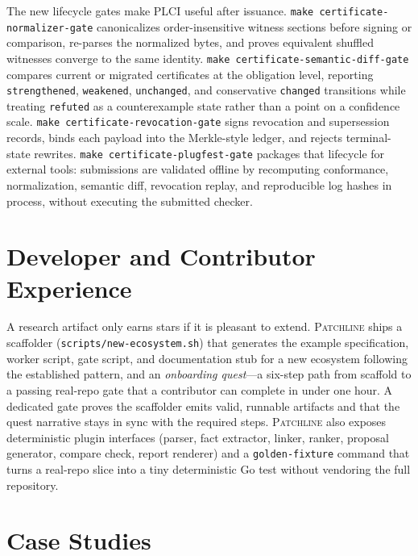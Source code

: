 \documentclass[11pt]{article}
\newcommand{\tool}{\textsc{Patchline}}
\newcommand{\code}[1]{\texttt{#1}}
\newcommand{\gate}[1]{\texttt{make #1}}
\begin{document}
The new lifecycle gates make PLCI useful after issuance. \gate{certificate-normalizer-gate}
canonicalizes order-insensitive witness sections before signing or comparison, re-parses the normalized
bytes, and proves equivalent shuffled witnesses converge to the same identity. \gate{certificate-semantic-diff-gate}
compares current or migrated certificates at the obligation level, reporting \code{strengthened},
\code{weakened}, \code{unchanged}, and conservative \code{changed} transitions while treating
\code{refuted} as a counterexample state rather than a point on a confidence scale.
\gate{certificate-revocation-gate} signs revocation and supersession records, binds each payload into
the Merkle-style ledger, and rejects terminal-state rewrites. \gate{certificate-plugfest-gate} packages
that lifecycle for external tools: submissions are validated offline by recomputing conformance,
normalization, semantic diff, revocation replay, and reproducible log hashes in process, without
executing the submitted checker.

\section{Developer and Contributor Experience}

A research artifact only earns stars if it is pleasant to extend. \tool{} ships a scaffolder
(\code{scripts/new-ecosystem.sh}) that generates the example specification, worker script, gate
script, and documentation stub for a new ecosystem following the established pattern, and an
\emph{onboarding quest}---a six-step path from scaffold to a passing real-repo gate that a
contributor can complete in under one hour. A dedicated gate proves the scaffolder emits valid,
runnable artifacts and that the quest narrative stays in sync with the required steps. \tool{} also
exposes deterministic plugin interfaces (parser, fact extractor, linker, ranker, proposal generator,
compare check, report renderer) and a \code{golden-fixture} command that turns a real-repo slice into
a tiny deterministic Go test without vendoring the full repository.

\section{Case Studies}
\end{document}
